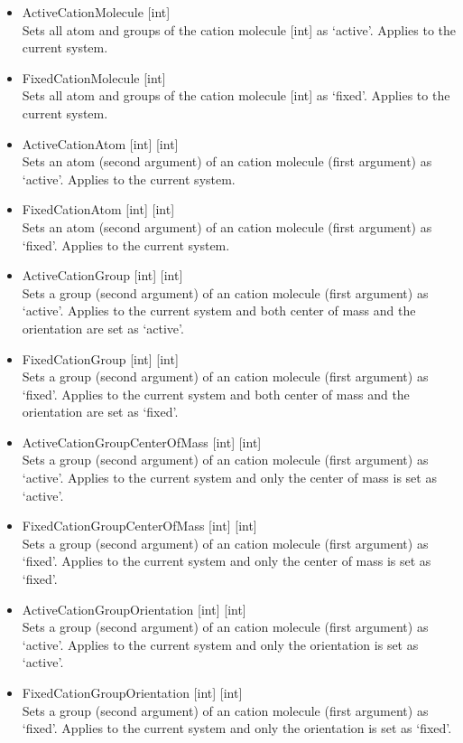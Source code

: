 \begin{itemize}
\item{ActiveCationMolecule [int]}\\
Sets all atom and groups of the cation molecule [int] as `active'. Applies to the current system.
\item{FixedCationMolecule [int]}\\
Sets all atom and groups of the cation molecule [int] as `fixed'. Applies to the current system.
\item{ActiveCationAtom [int] [int]}\\
Sets an atom (second argument) of an cation molecule (first argument) as `active'. Applies to the current system.
\item{FixedCationAtom [int] [int]}\\
Sets an atom (second argument) of an cation molecule (first argument) as `fixed'. Applies to the current system.
\item{ActiveCationGroup [int] [int]}\\
Sets a group (second argument) of an cation molecule (first argument) as `active'. Applies to the current system
and both center of mass and the orientation are set as `active'.
\item{FixedCationGroup [int] [int]}\\
Sets a group (second argument) of an cation molecule (first argument) as `fixed'. Applies to the current system
and both center of mass and the orientation are set as `fixed'.
\item{ActiveCationGroupCenterOfMass [int] [int]}\\
Sets a group (second argument) of an cation molecule (first argument) as `active'. Applies to the current system
and only the center of mass is set as `active'.
\item{FixedCationGroupCenterOfMass [int] [int]}\\
Sets a group (second argument) of an cation molecule (first argument) as `fixed'. Applies to the current system
and only the center of mass is set as `fixed'.
\item{ActiveCationGroupOrientation [int] [int]}\\
Sets a group (second argument) of an cation molecule (first argument) as `active'. Applies to the current system
and only the orientation is set as `active'.
\item{FixedCationGroupOrientation [int] [int]}\\
Sets a group (second argument) of an cation molecule (first argument) as `fixed'. Applies to the current system
and only the orientation is set as `fixed'.





\end{itemize}
